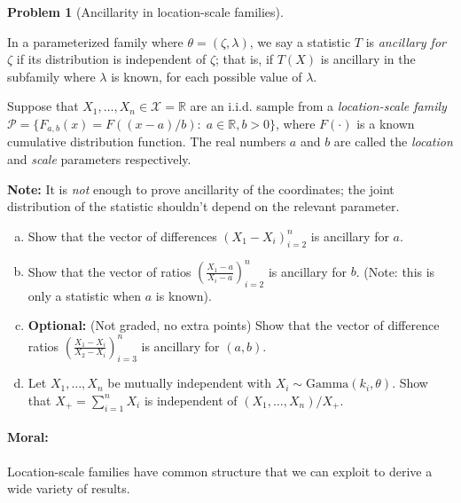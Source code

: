 \documentclass{article}
\newcommand{\cP}{\mathcal{P}}
\newcommand{\cX}{\mathcal{X}}
\newcommand{\RR}{\mathbb{R}}
\newcommand{\optional}{{\bf Optional:} (Not graded, no extra points) }
\theoremstyle{definition}
\newtheorem{problem}{Problem}
\begin{document}
\begin{problem}[Ancillarity in location-scale families]
\label{prob:ancillary-locscale}

In a parameterized family where $\theta = (\zeta, \lambda)$, we say a statistic $T$ is {\em ancillary for $\zeta$} if its distribution is independent of $\zeta$; that is, if $T(X)$ is ancillary in the subfamily where $\lambda$ is known, for each possible value of $\lambda$.

Suppose that $X_1,\ldots,X_n\in \cX=\RR$ are an i.i.d. sample from a {\em location-scale family} $\cP = \{F_{a,b}(x) = F((x-a)/b): \; a\in \RR, b>0\}$, where $F(\cdot)$ is a known cumulative distribution function. The real numbers $a$ and $b$ are called the {\em location} and {\em scale} parameters respectively. 

{\bf Note:} It is {\em not} enough to prove ancillarity of the coordinates; the joint distribution of the statistic shouldn't depend on the relevant parameter.
\begin{enumerate}[(a)]
\item Show that the vector of differences $\left(X_1 - X_i\right)_{i = 2}^n$ is ancillary for $a$.


\item Show that the vector of ratios $\left(\frac{X_1 - a}{X_i - a}\right)_{i=2}^n$ is ancillary for $b$. (Note: this is only a statistic when $a$ is known).


\item \optional Show that the vector of difference ratios $\left(\frac{X_1 - X_i}{X_2 - X_i}\right)_{i=3}^n$ is ancillary for $(a,b)$.

\item Let $X_1,\ldots,X_n$ be mutually independent with $X_i \sim \text{Gamma}(k_i, \theta)$. Show that $X_+ = \sum_{i=1}^n X_i$ is independent of $(X_1,\ldots,X_n)/X_+$.


\end{enumerate}

\paragraph{Moral:} Location-scale families have common structure that we can exploit to derive a wide variety of results.
\end{problem}






\end{document}
